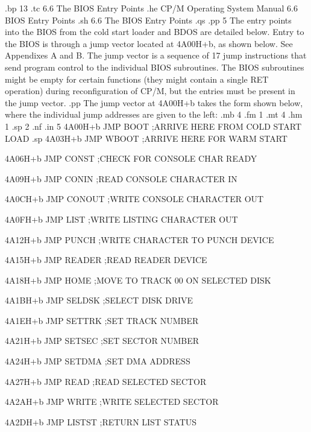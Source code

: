 .bp 13
.tc    6.6  The BIOS Entry Points
.he CP/M Operating System Manual               6.6  BIOS Entry Points
.sh
6.6  The BIOS Entry Points
.qs
.pp 5
The entry points into the BIOS from the cold start loader and 
BDOS are detailed below.  Entry to the BIOS is through a jump 
vector located at 4A00H+b, as shown below.  See Appendixes A and 
B.  The jump vector is a sequence of 17 jump 
instructions that send program control to the individual BIOS 
subroutines.  The BIOS subroutines might be empty for certain 
functions (they might contain a single RET operation) 
during reconfiguration of CP/M, but the entries must be present 
in the jump vector.
.pp
The jump vector at 4A00H+b takes the form shown below, where the 
individual jump addresses are given to the left:
.mb 4
.fm 1
.mt 4
.hm 1
.sp 2
.nf
.in 5
4A00H+b      JMP BOOT       ;ARRIVE HERE FROM COLD
                             START LOAD
.sp
4A03H+b      JMP WBOOT      ;ARRIVE HERE FOR WARM START

4A06H+b      JMP CONST      ;CHECK FOR CONSOLE CHAR
                             READY

4A09H+b      JMP CONIN      ;READ CONSOLE CHARACTER IN

4A0CH+b      JMP CONOUT     ;WRITE CONSOLE CHARACTER 
                             OUT
 
4A0FH+b      JMP LIST       ;WRITE LISTING CHARACTER OUT

4A12H+b      JMP PUNCH      ;WRITE CHARACTER TO PUNCH
                             DEVICE

4A15H+b      JMP READER     ;READ READER DEVICE

4A18H+b      JMP HOME       ;MOVE TO TRACK 00 ON
                             SELECTED DISK

4A1BH+b      JMP SELDSK     ;SELECT DISK DRIVE

4A1EH+b      JMP SETTRK     ;SET TRACK NUMBER

4A21H+b      JMP SETSEC     ;SET SECTOR NUMBER

4A24H+b      JMP SETDMA     ;SET DMA ADDRESS

4A27H+b      JMP READ       ;READ SELECTED SECTOR

4A2AH+b      JMP WRITE      ;WRITE SELECTED SECTOR

4A2DH+b      JMP LISTST     ;RETURN LIST STATUS

